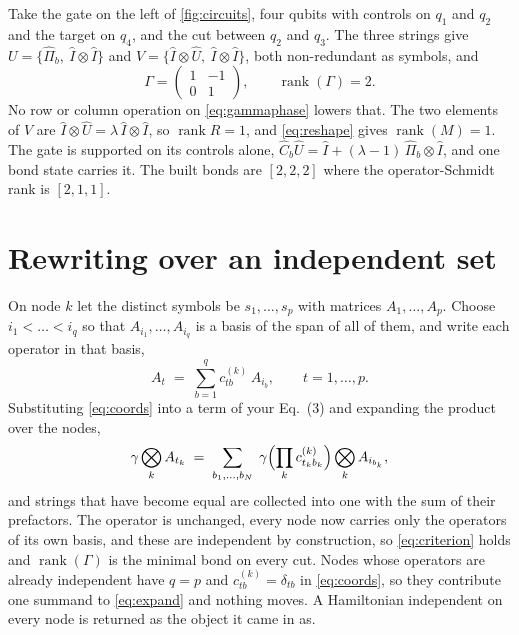 \documentclass[11pt,a4paper]{article}
\newcommand{\rank}{\operatorname{rank}}
\begin{document}
Take the gate on the left of \cref{fig:circuits}, four qubits with controls on $q_1$ and $q_2$ and
the target on $q_4$, and the cut between $q_2$ and $q_3$. The three strings give
$U = \{\hat{\Pi}_b,\ \hat{I}\otimes\hat{I}\}$ and
$V = \{\hat{I}\otimes\hat{U},\ \hat{I}\otimes\hat{I}\}$, both non-redundant as symbols, and
%
\begin{equation}\label{eq:gammaphase}
  \Gamma = \begin{pmatrix} 1 & -1 \\ 0 & 1 \end{pmatrix},
  \qquad \rank(\Gamma) = 2 .
\end{equation}
%
No row or column operation on \cref{eq:gammaphase} lowers that. The two elements of $V$ are
$\hat{I}\otimes\hat{U} = \lambda\, \hat{I}\otimes\hat{I}$, so $\rank R = 1$, and \cref{eq:reshape}
gives $\rank(M) = 1$. The gate is supported on its controls alone,
$\hat{C}_b\hat{U} = \hat{I} + (\lambda - 1)\, \hat{\Pi}_b \otimes \hat{I}$, and one bond state
carries it. The built bonds are $[2,2,2]$ where the operator-Schmidt rank is $[2,1,1]$.

\section{Rewriting over an independent set}\label{sec:rewrite}

On node $k$ let the distinct symbols be $s_1,\dots,s_p$ with matrices $A_1,\dots,A_p$. Choose
$i_1 < \dots < i_q$ so that $A_{i_1},\dots,A_{i_q}$ is a basis of the span of all of them, and write
each operator in that basis,
%
\begin{equation}\label{eq:coords}
  A_t \;=\; \sum_{b=1}^{q} c^{(k)}_{tb}\, A_{i_b},
  \qquad t = 1,\dots,p .
\end{equation}
%
Substituting \cref{eq:coords} into a term of your Eq.~(3) and expanding the product over the nodes,
%
\begin{equation}\label{eq:expand}
  \gamma \bigotimes_{k} A_{t_k}
  \;=\; \sum_{b_1,\dots,b_N}\;
        \gamma \Bigl(\prod_{k} c^{(k)}_{t_k b_k}\Bigr) \bigotimes_{k} A_{i_{b_k}},
\end{equation}
%
and strings that have become equal are collected into one with the sum of their prefactors. The
operator is unchanged, every node now carries only the operators of its own basis, and these are
independent by construction, so \cref{eq:criterion} holds and $\rank(\Gamma)$ is the minimal bond on
every cut. Nodes whose operators are already independent have $q = p$ and $c^{(k)}_{tb} = \delta_{tb}$
in \cref{eq:coords}, so they contribute one summand to \cref{eq:expand} and nothing moves. A
Hamiltonian independent on every node is returned as the object it came in as.
\end{document}
